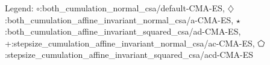 Legend: {\color{CornflowerBlue}$\circ$}:both\_cumulation\_normal\_csa/default-CMA-ES, {\color{Orange}$\diamondsuit$}:both\_cumulation\_affine\_invariant\_normal\_csa/a-CMA-ES, {\color{Green}$\star$}:both\_cumulation\_affine\_invariant\_squared\_csa/ad-CMA-ES, {\color{red}+}:stepsize\_cumulation\_affine\_invariant\_normal\_csa/ac-CMA-ES, {\color{magenta}$\pentagon$}:stepsize\_cumulation\_affine\_invariant\_squared\_csa/acd-CMA-ES